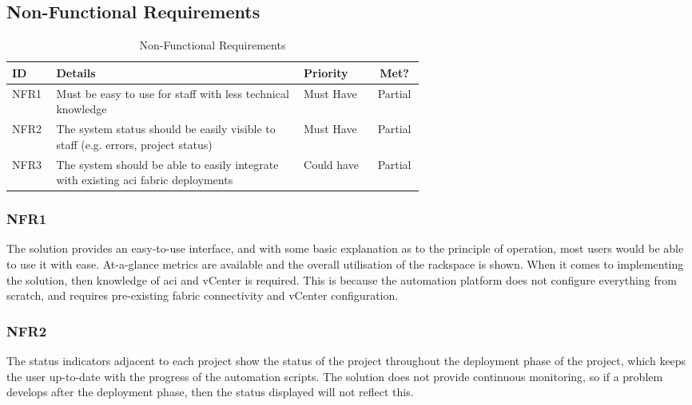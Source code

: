 \subsection{Non-Functional Requirements}

\begin{center}
    \begin{table}[H]
        \begin{tabular}{l p{0.6\linewidth} l c}
            \textbf{ID}             & \textbf{Details}
                                    & \textbf{Priority}
                                    & \textbf{Met?}
            \\ \hline
            NFR1                    & Must be easy to use for staff with less technical
            knowledge
                                    & Must Have
                                    & \cellcolor{yellow!25}Partial
            \\ \hline
            NFR2                    & The system status should be easily visible to staff (e.g.
            errors, project status) & Must Have
                                    & \cellcolor{yellow!25}Partial
                                                                             \\ \hline
            NFR3                    & The system should be able to easily integrate with existing \gls{aci} fabric deployments & Could have & \cellcolor{yellow!25}Partial
        \end{tabular}
        \caption{Non-Functional Requirements}
        \label{table:evaluation-non-functional-requirements}
    \end{table}
\end{center}

\subsubsection{NFR1}
The solution provides an easy-to-use interface, and with some basic explanation as to the principle of operation, most users would be able to use it with ease. At-a-glance metrics are available and the overall utilisation of the rackspace is shown. When it comes to implementing the solution, then knowledge of \gls{aci} and vCenter is required. This is because the automation platform does not configure everything from scratch, and requires pre-existing fabric connectivity and vCenter configuration.

\subsubsection{NFR2}
The status indicators adjacent to each project show the status of the project throughout the deployment phase of the project, which keeps the user up-to-date with the progress of the automation scripts. The solution does not provide continuous monitoring, so if a problem develops after the deployment phase, then the status displayed will not reflect this.

